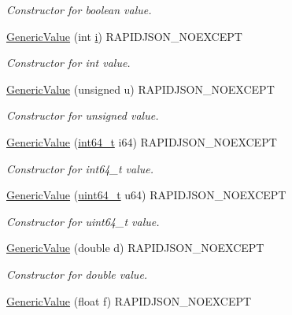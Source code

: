 \begin{DoxyCompactItemize}
\begin{DoxyCompactList}\small\item\em Constructor for boolean value. \end{DoxyCompactList}\item 
\hyperlink{classGenericValue_aafc754ade38421c179f5c8933ecbaf45}{Generic\+Value} (int \hyperlink{game__play__state_8cpp_acb559820d9ca11295b4500f179ef6392}{i}) R\+A\+P\+I\+D\+J\+S\+O\+N\+\_\+\+N\+O\+E\+X\+C\+E\+PT
\begin{DoxyCompactList}\small\item\em Constructor for int value. \end{DoxyCompactList}\item 
\hyperlink{classGenericValue_a972bff6c56ac3d04622ff7fad8d98331}{Generic\+Value} (unsigned u) R\+A\+P\+I\+D\+J\+S\+O\+N\+\_\+\+N\+O\+E\+X\+C\+E\+PT
\begin{DoxyCompactList}\small\item\em Constructor for unsigned value. \end{DoxyCompactList}\item 
\hyperlink{classGenericValue_a964b69f1d2596f75ded5421b6db01a14}{Generic\+Value} (\hyperlink{stdint_8h_a414156feea104f8f75b4ed9e3121b2f6}{int64\+\_\+t} i64) R\+A\+P\+I\+D\+J\+S\+O\+N\+\_\+\+N\+O\+E\+X\+C\+E\+PT
\begin{DoxyCompactList}\small\item\em Constructor for int64\+\_\+t value. \end{DoxyCompactList}\item 
\hyperlink{classGenericValue_ad04805a57f5050c8e04be469ba64d6f3}{Generic\+Value} (\hyperlink{stdint_8h_aec6fcb673ff035718c238c8c9d544c47}{uint64\+\_\+t} u64) R\+A\+P\+I\+D\+J\+S\+O\+N\+\_\+\+N\+O\+E\+X\+C\+E\+PT
\begin{DoxyCompactList}\small\item\em Constructor for uint64\+\_\+t value. \end{DoxyCompactList}\item 
\hyperlink{classGenericValue_a267d05b7e98c3507908eaf085fe41155}{Generic\+Value} (double d) R\+A\+P\+I\+D\+J\+S\+O\+N\+\_\+\+N\+O\+E\+X\+C\+E\+PT
\begin{DoxyCompactList}\small\item\em Constructor for double value. \end{DoxyCompactList}\item 
\hyperlink{classGenericValue_acad11ab781251634a3c079aa64a6d283}{Generic\+Value} (float f) R\+A\+P\+I\+D\+J\+S\+O\+N\+\_\+\+N\+O\+E\+X\+C\+E\+PT

\end{DoxyCompactItemize}
